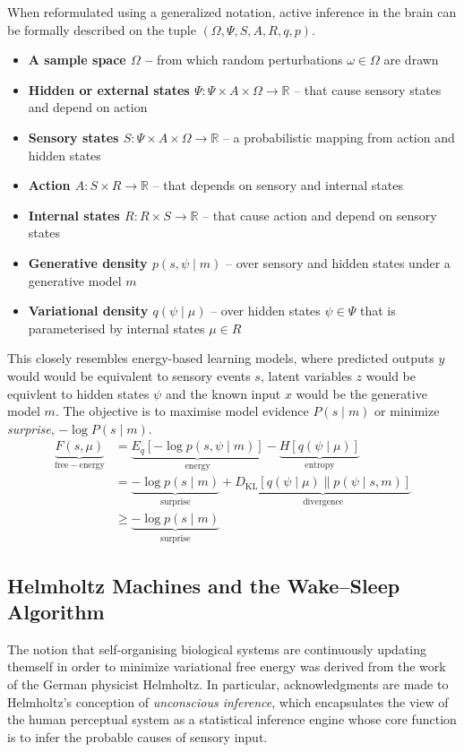 \documentclass{article}
\begin{document}
When reformulated using a generalized notation, active inference in the brain can be formally described on the tuple $(\Omega ,\Psi ,S,A,R,q,p)$. 
\begin{itemize}
    \item \textbf{A sample space $\Omega$  –} from which random perturbations $\omega \in \Omega$  are drawn
    \item \textbf{Hidden or external states $\Psi:\Psi\times A \times \Omega \to \mathbb{R}$} – that cause sensory states and depend on action
    \item \textbf{Sensory states $S:\Psi \times A \times \Omega \to \mathbb{R}$} – a probabilistic mapping from action and hidden states
    \item \textbf{Action $A:S\times R \to \mathbb{R}$} – that depends on sensory and internal states
    \item \textbf{Internal states $R:R\times S \to \mathbb{R}$} – that cause action and depend on sensory states
    \item \textbf{Generative density $p(s,\psi \mid m)$} – over sensory and hidden states under a generative model $m$
    \item \textbf{Variational density $q(\psi \mid \mu )$} – over hidden states $\psi \in \Psi$ that is parameterised by internal states $\mu \in R$
\end{itemize}

This closely resembles energy-based learning models, where predicted outputs $y$ would would be equivalent to sensory events $s$, latent variables $z$ would be equivlent to hidden states $\psi$ and the known input $x$ would be the generative model $m$. The objective is to maximise model evidence $P(s\mid m)$ or minimize \textit{surprise}, $-\log P(s\mid m)$.
\begin{align*}
    \underset {\mathrm {free-energy} }{\underbrace {F(s,\mu )}} 
    &={\underset {\mathrm {energy} }{\underbrace {E_{q}[-\log p(s,\psi \mid m)]} }}-{\underset {\mathrm {entropy} }{\underbrace {H[q(\psi \mid \mu )]} }}\\
    &={\underset {\mathrm {surprise} }{\underbrace {-\log p(s\mid m)} }}+{\underset {\mathrm {divergence} }{\underbrace {D_{\mathrm {KL} }[q(\psi \mid \mu )\parallel p(\psi \mid s,m)]} }}\\
    &\geq {\underset {\mathrm {surprise} }{\underbrace {-\log p(s\mid m)} }}
\end{align*}


\subsection{Helmholtz Machines and the Wake--Sleep Algorithm}
The notion that self-organising biological systems are continuously updating themself in order to minimize variational free energy was derived from the work of the German physicist Helmholtz. In particular, acknowledgments are made to Helmholtz's conception of \textit{unconscious inference}, which encapsulates the view of the human perceptual system as a statistical inference engine whose core function is to infer the probable causes of sensory input.
\end{document}
